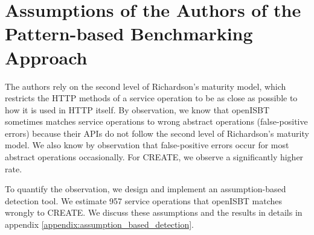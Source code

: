 \section{Assumptions of the Authors of the Pattern-based Benchmarking Approach}
\label{sec:discussion_limitations_approach}

The authors rely on the second level of Richardson’s maturity model, which restricts the HTTP methods of a service operation to be as close as possible to how it is used in HTTP itself.
By observation, we know that openISBT sometimes matches service operations to wrong abstract operations (false-positive errors) because their APIs do not follow the second level of Richardson’s maturity model.
We also know by observation that false-positive errors occur for most abstract operations occasionally. For CREATE, we observe a significantly higher rate.

To quantify the observation, we design and implement an assumption-based detection tool. We estimate 957 service operations that openISBT matches wrongly to CREATE. We discuss these assumptions and the results in details in appendix \ref{appendix:assumption_based_detection}.



















